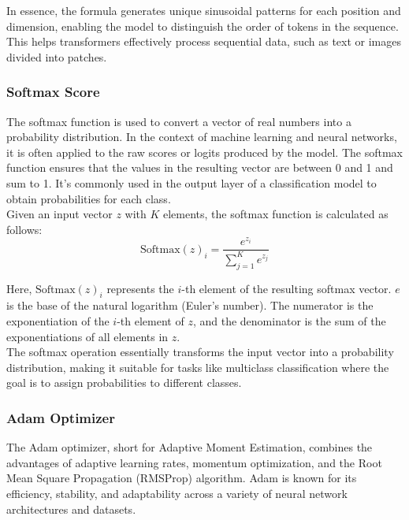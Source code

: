 In essence, the formula generates unique sinusoidal patterns for each position and dimension, enabling the model to distinguish the order of tokens in the sequence. This helps transformers effectively process sequential data, such as text or images divided into patches.\\

\subsubsection{Softmax Score}
The softmax function is used to convert a vector of real numbers into a probability distribution. In the context of machine learning and neural networks, it is often applied to the raw scores or logits produced by the model. The softmax function ensures that the values in the resulting vector are between 0 and 1 and sum to 1. It's commonly used in the output layer of a classification model to obtain probabilities for each class.\\

Given an input vector \(z\) with \(K\) elements, the softmax function is calculated as follows:\\

\begin{equation}
    \text{Softmax}(z)_i = \frac{e^{z_i}}{\sum_{j=1}^{K} e^{z_j}} \label{eq:softmax}
\end{equation}


Here, \(\text{Softmax}(z)_i\) represents the \(i\)-th element of the resulting softmax vector. \(e\) is the base of the natural logarithm (Euler's number). The numerator is the exponentiation of the \(i\)-th element of \(z\), and the denominator is the sum of the exponentiations of all elements in \(z\).\\

The softmax operation essentially transforms the input vector into a probability distribution, making it suitable for tasks like multiclass classification where the goal is to assign probabilities to different classes.\\

\subsubsection{Adam Optimizer}

The Adam optimizer, short for Adaptive Moment Estimation, combines the advantages of adaptive learning rates, momentum optimization, and the Root Mean Square Propagation (RMSProp) algorithm. Adam is known for its efficiency, stability, and adaptability across a variety of neural network architectures and datasets.\\

